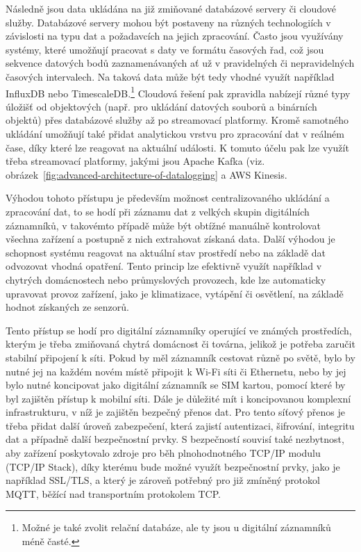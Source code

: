
Následně jsou data ukládána na již zmiňované databázové servery či cloudové služby. Databázové servery mohou být postaveny na různých technologiích v závislosti na typu dat a požadavcích na jejich zpracování. Často jsou využívány systémy, které umožňují pracovat s daty ve formátu časových řad, což jsou sekvence datových bodů zaznamenávaných ať už v pravidelných či nepravidelných časových intervalech. Na taková data může být tedy vhodné využít například InfluxDB nebo TimescaleDB.\footnote{Možné je také zvolit relační databáze, ale ty jsou u digitální záznamníků méně časté.} Cloudová řešení pak zpravidla nabízejí různé typy úložišť od objektových (např. pro ukládání datových souborů a binárních objektů) přes databázové služby až po streamovací platformy. Kromě samotného ukládání umožňují také přidat analytickou vrstvu pro zpracování dat v reálném čase, díky které lze reagovat na aktuální události. K tomuto účelu pak lze využít třeba streamovací platformy, jakými jsou Apache Kafka (viz. obrázek~\ref{fig:advanced-architecture-of-datalogging} a AWS Kinesis. \cite{springer_analysis_time_series_db_edge_computing}

Výhodou tohoto přístupu je především možnost centralizovaného ukládání a zpracování dat, to se hodí při záznamu dat z velkých skupin digitálních záznamníků, v takovémto případě může být obtížné manuálně kontrolovat všechna zařízení a postupně z nich extrahovat získaná data. Další výhodou je schopnost systému reagovat na aktuální stav prostředí nebo na základě dat odvozovat vhodná opatření. Tento princip lze efektivně využít například v chytrých domácnostech nebo průmyslových provozech, kde lze automaticky upravovat provoz zařízení, jako je klimatizace, vytápění či osvětlení, na základě hodnot získaných ze senzorů. \cite{springer_analysis_time_series_db_edge_computing}

Tento přístup se hodí pro digitální záznamníky operující ve známých prostředích, kterým je třeba zmiňovaná chytrá domácnost či továrna, jelikož je potřeba zaručit stabilní připojení k síti. Pokud by měl záznamník cestovat různě po světě, bylo by nutné jej na každém novém místě připojit k Wi-Fi síti či Ethernetu, nebo by jej bylo nutné koncipovat jako digitální záznamník se SIM kartou, pomocí které by byl zajištěn přístup k mobilní síti. Dále je důležité mít i koncipovanou komplexní infrastrukturu, v níž je zajištěn bezpečný přenos dat. Pro tento síťový přenos je třeba přidat další úroveň zabezpečení, která zajistí autentizaci, šifrování, integritu dat a případně další bezpečnostní prvky. S bezpečností souvisí také nezbytnost, aby zařízení poskytovalo zdroje pro běh plnohodnotného TCP/IP modulu (TCP/IP Stack), díky kterému bude možné využít bezpečnostní prvky, jako je například SSL/TLS, a který je zároveň potřebný pro již zmíněný protokol MQTT, běžící nad transportním protokolem TCP.

